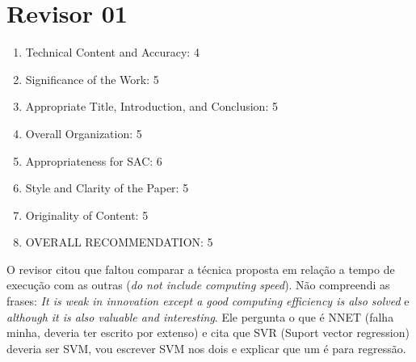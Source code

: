 \section{Revisor 01}
\begin{frame}
	\begin{enumerate}
		\item Technical Content and Accuracy: 4
		\item Significance of the Work: 5
		\item Appropriate Title, Introduction, and Conclusion: 5
		\item Overall Organization: 5
		\item Appropriateness for SAC: 6
		\item Style and Clarity of the Paper: 5
		\item Originality of Content: 5
		\item OVERALL RECOMMENDATION: 5
	\end{enumerate}
O revisor citou que faltou comparar a técnica proposta em relação a tempo de execução com as outras (\emph{do not include computing speed}). Não compreendi as frases: \emph{It is weak in innovation except a good computing efficiency is also solved} e \emph{although it is also valuable and interesting}. Ele pergunta o que é NNET (falha minha, deveria ter escrito por extenso) e cita que SVR (Suport vector regression) deveria ser SVM, vou escrever SVM nos dois e explicar que um é para regressão.
\end{frame}



